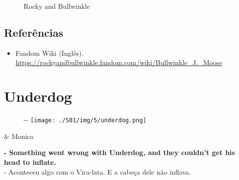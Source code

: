\begin{figure}
  \centering
    \caption{Rocky and Bullwinkle\label{fig:rocky-and-bullwinkle}}
\end{figure}

\hypertarget{referuxeancias}{%
\subsection{Referências}\label{referuxeancias}}

\begin{itemize}
\tightlist
\item
  \sloppy Fandom Wiki (Inglês). \url{https://rockyandbullwinkle.fandom.com/wiki/Bullwinkle_J._Moose}
\end{itemize}

\hypertarget{underdog}{%
\section{Underdog}\label{underdog}}

\begin{figure}[!ht]
  \begin{adjustwidth}{-\oddsidemargin-1in}{-\rightmargin}
    \centering
    \texttt{[image: ./S01/img/5/underdog.png]}
  \end{adjustwidth}
\end{figure}

\begin{tcolorbox}[enhanced,center upper,
    drop fuzzy shadow southeast, boxrule=0.3pt,
    lower separated=false,
    colframe=black!30!dialogoBorder,colback=white]
\begin{minipage}[c]{0.16\linewidth}
   & \centering \scriptsize{Monica}
\end{minipage}
\hfill
\begin{minipage}[c]{0.8\linewidth}
  \textbf{- Something went wrong with Underdog, and they couldn't get his head to inflate.}\\
  - Aconteceu algo com o Vira-lata. E a cabeça dele não inflava.
\end{minipage}
\end{tcolorbox}

